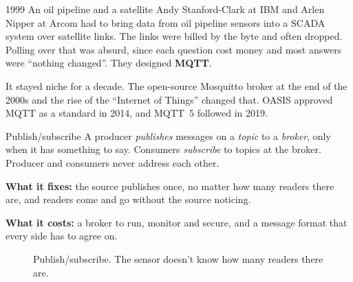 \begin{history}{1999 \textperiodcentered{} An oil pipeline and a satellite}
Andy Stanford-Clark at IBM and Arlen Nipper at Arcom had to bring data from oil
pipeline sensors into a SCADA system over satellite links. The links were billed
by the byte and often dropped. Polling over that was absurd, since each question
cost money and most answers were ``nothing changed''. They designed
\textbf{MQTT}.

It stayed niche for a decade. The open-source Mosquitto broker at the end of the
2000s and the rise of the ``Internet of Things'' changed that. OASIS approved
MQTT as a standard in 2014, and MQTT~5 followed in 2019.
\end{history}

\begin{concept}{Publish/subscribe}
A producer \emph{publishes} messages on a \emph{topic} to a \emph{broker}, only
when it has something to say. Consumers \emph{subscribe} to topics at the
broker. Producer and consumers never address each other.

\textbf{What it fixes:} the source publishes once, no matter how many readers
there are, and readers come and go without the source noticing.

\textbf{What it costs:} a broker to run, monitor and secure, and a message
format that every side has to agree on.
\end{concept}

\begin{figure}[htbp]
\centering
{}
\caption{Publish/subscribe. The sensor doesn't know how many readers there are.}
\end{figure}

